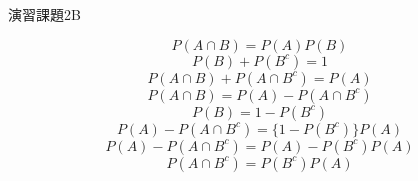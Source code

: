 \documentclass[dvipdfmx,uplatex]{jsarticle}
\begin{document}
  \newpage
  \centerline{\huge 演習課題2B}
  \vspace{10mm}
  \begin{equation}
    P(A \cap B) = P(A)P(B)
  \end{equation}
  \begin{equation}
    P(B) + P(B^c) = 1
  \end{equation}
  \begin{equation}
    P(A \cap B) + P(A \cap B^c) = P(A)
  \end{equation}
  \begin{equation}
    P(A \cap B) = P(A) - P(A \cap B^c)
  \end{equation}
  \begin{equation}
    P(B) = 1 - P(B^c)
  \end{equation}
  \begin{equation}
    P(A) - P(A \cap B^c) = \{1 - P(B^c)\}P(A)
  \end{equation}
  \begin{equation}
    P(A) - P(A \cap B^c) = P(A) - P(B^c)P(A)
  \end{equation}
  \begin{equation}
    P(A \cap B^c) = P(B^c)P(A)
  \end{equation}
\end{document}
